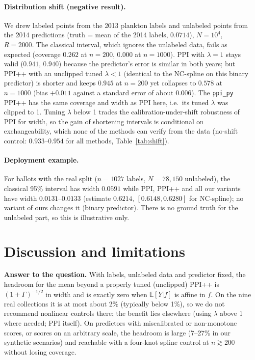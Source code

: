 \documentclass{article}
\newcommand{\E}{\mathbb{E}}
\begin{document}
\paragraph{Distribution shift (negative result).}
We drew labeled points from the 2013 plankton labels and unlabeled points from the 2014 predictions (truth = mean of the 2014 labels, $0.0714$), $N=10^4$, $R=2000$. The classical interval, which ignores the unlabeled data, fails as expected (coverage $0.262$ at $n=200$, $0.000$ at $n=1000$). PPI with $\lambda=1$ stays valid ($0.941$, $0.940$) because the predictor's error is similar in both years; but PPI++ with an unclipped tuned $\lambda<1$ (identical to the NC-spline on this binary predictor) is shorter and keeps $0.945$ at $n=200$ yet collapses to $0.578$ at $n=1000$ (bias $+0.011$ against a standard error of about $0.006$). The \texttt{ppi\_py} PPI++ has the same coverage and width as PPI here, i.e.\ its tuned $\lambda$ was clipped to 1. Tuning $\lambda$ below 1 trades the calibration-under-shift robustness of PPI for width, so the gain of shortening intervals is conditional on exchangeability, which none of the methods can verify from the data (no-shift control: $0.933$--$0.954$ for all methods, Table~\ref{tab:shift}).

\paragraph{Deployment example.} For ballots with the real split ($n=1027$ labels, $N=78{,}150$ unlabeled), the classical 95\% interval has width $0.0591$ while PPI, PPI++ and all our variants have width $0.0131$--$0.0133$ (estimate $0.6214$, $[0.6148,0.6280]$ for NC-spline); no variant of ours changes it (binary predictor). There is no ground truth for the unlabeled part, so this is illustrative only.

\section{Discussion and limitations}
\textbf{Answer to the question.} With labels, unlabeled data and predictor fixed, the headroom for the mean beyond a properly tuned (unclipped) PPI++ is $(1+\Gamma)^{-1/2}$ in width and is exactly zero when $\E[Y|f]$ is affine in $f$. On the nine real collections it is at most about 2\% (typically below 1\%), so we do not recommend nonlinear controls there; the benefit lies elsewhere (using $\lambda$ above 1 where needed; PPI itself). On predictors with miscalibrated or non-monotone scores, or scores on an arbitrary scale, the headroom is large (7--27\% in our synthetic scenarios) and reachable with a four-knot spline control at $n\gtrsim200$ without losing coverage.
\end{document}
